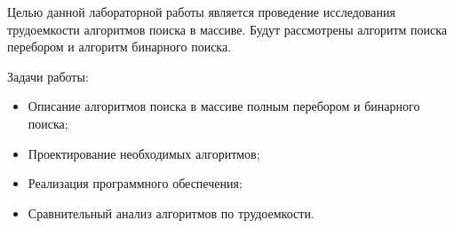 
Целью данной лабораторной работы является проведение исследования трудоемкости алгоритмов поиска в массиве. Будут рассмотрены алгоритм поиска перебором и алгоритм бинарного поиска.

Задачи работы:
\begin{itemize}
    \item Описание алгоритмов поиска в массиве полным перебором и бинарного поиска;
    \item Проектирование необходимых алгоритмов;
    \item Реализация программного обеспечения;
    \item Сравнительный анализ алгоритмов по трудоемкости.
\end{itemize}

\clearpage
